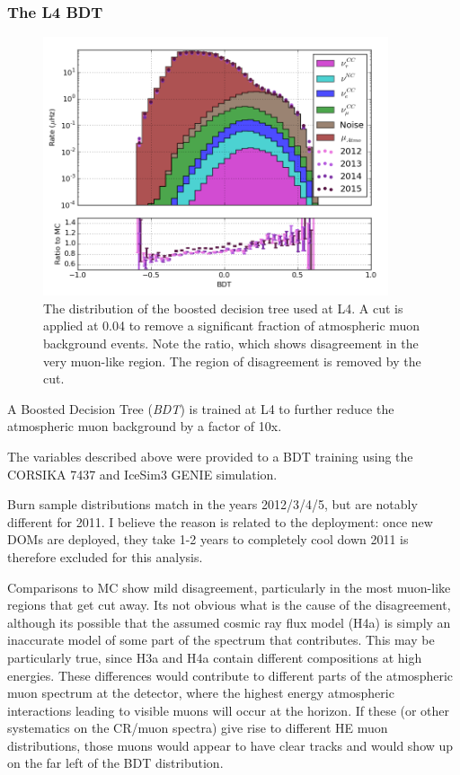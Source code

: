 \subsubsection{The L4 BDT}
\begin{figure}[h]
	\centering
		\includegraphics[width=4in]{BDT_log.png}
		\caption[The L4 BDT Score]{The distribution of the boosted decision tree used at L4. A cut is applied at 0.04 to remove a significant fraction of atmospheric muon background events. Note the ratio, which shows disagreement in the very muon-like region. The region of disagreement is removed by the cut.}
	\label{fig:L4_bdt_log}
\end{figure}

A Boosted Decision Tree (\emph{BDT}) is trained at L4 to further reduce the atmospheric muon background by a factor of 10x. 

The variables described above were provided to a BDT training using the CORSIKA 7437 and IceSim3 GENIE simulation. 

Burn sample distributions match in the years 2012/3/4/5, but are notably different for 2011. 
I believe the reason is related to the deployment: once new DOMs are deployed, they take 1-2 years to completely cool down 2011 is therefore excluded for this analysis.

Comparisons to MC show mild disagreement, particularly in the most muon-like regions that get cut away. 
Its not obvious what is the cause of the disagreement, although its possible that the assumed cosmic ray flux model (H4a) is simply an inaccurate model of some part of the spectrum that contributes. 
This may be particularly true, since H3a and H4a contain different compositions at high energies. 
These differences would contribute to different parts of the atmospheric muon spectrum at the detector, where the highest energy atmospheric interactions leading to visible muons will occur at the horizon. 
If these (or other systematics on the CR/muon spectra) give rise to different HE muon distributions, those muons would appear to have clear tracks and would show up on the far left of the BDT distribution.


